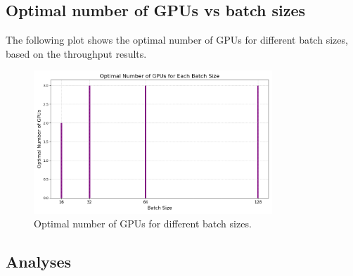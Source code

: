 \documentclass{article}
\begin{document}
\subsection{Optimal number of GPUs vs batch sizes}
The following plot shows the optimal number of GPUs for different batch sizes, based on the throughput results.

\begin{figure}[h!]
    \centering
    \includegraphics[width=0.8\textwidth]{GPU/optimal_gpus.png}
    \caption{Optimal number of GPUs for different batch sizes.}
    \label{fig:optimal_gpus}
\end{figure}

\subsection{Analyses}
\end{document}
